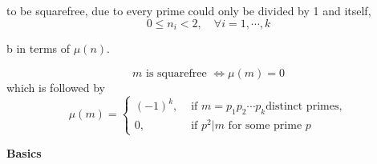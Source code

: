 \documentclass[a4paper,12pt]{article}
\makeatletter
\newtheorem*{solution}{Solution}
\theoremstyle{definition}
\renewenvironment{solution}[1][Solution] {\par\pushQED{\qed}\normalfont\topsep6\p@\@plus6\p@\relax\trivlist\item[\hskip\labelsep\bfseries#1\@addpunct{.}]\ignorespaces}{\popQED\endtrivlist\@endpefalse} \makeatother
\newenvironment{problems}{\begin{list}{}{\renewcommand{\makelabel}[1]{\textbf{##1}\hfil}}}{\end{list}}
\newenvironment{steps}{\begin{list}{}{\renewcommand{\makelabel}[1]{\textbf{##1}\hfil}}}{\end{list}}
\makeatother
\begin{document}
\begin{problems}
\begin{steps}
\begin{solution}
            to be squarefree, due to every prime could only be divided by 1 and itself,
            \begin{equation*}
                0\leq n_i<2,\quad \forall i=1,\cdots,k
            \end{equation*}
        \end{solution} 
        \item[b]  in terms of $\mu(n)$.
        \begin{solution}
            \begin{equation*}
                m\text{ is squarefree }\Leftrightarrow \mu(m)=0
            \end{equation*}
            which is followed by
            \begin{equation*}
                \mu(m) = \begin{cases}
                    (-1)^k,&\text{ if }m=p_1p_2\cdots p_k \text{distinct primes},\\
                    0,&\text{ if }p^2|m\text{ for some prime }p
                \end{cases}
            \end{equation*}
        \end{solution}
    \end{steps}
\end{problems}

\noindent\textbf{Basics}
\end{document}
